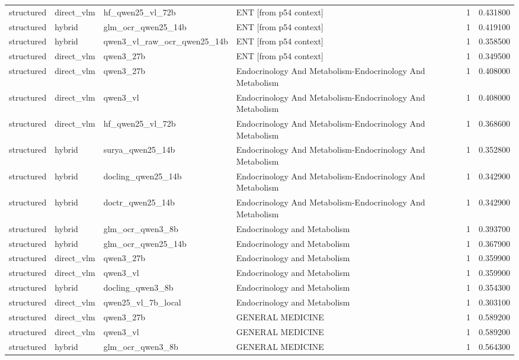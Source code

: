 \begin{tabular}{llllrr}
structured & direct\_vlm & hf\_qwen25\_vl\_72b & ENT [from p54 context] & 1 & 0.431800 \\
structured & hybrid & glm\_ocr\_qwen25\_14b & ENT [from p54 context] & 1 & 0.419100 \\
structured & hybrid & qwen3\_vl\_raw\_ocr\_qwen25\_14b & ENT [from p54 context] & 1 & 0.358500 \\
structured & direct\_vlm & qwen3\_27b & ENT [from p54 context] & 1 & 0.349500 \\
structured & direct\_vlm & qwen3\_27b & Endocrinology And Metabolism-Endocrinology And Metabolism & 1 & 0.408000 \\
structured & direct\_vlm & qwen3\_vl & Endocrinology And Metabolism-Endocrinology And Metabolism & 1 & 0.408000 \\
structured & direct\_vlm & hf\_qwen25\_vl\_72b & Endocrinology And Metabolism-Endocrinology And Metabolism & 1 & 0.368600 \\
structured & hybrid & surya\_qwen25\_14b & Endocrinology And Metabolism-Endocrinology And Metabolism & 1 & 0.352800 \\
structured & hybrid & docling\_qwen25\_14b & Endocrinology And Metabolism-Endocrinology And Metabolism & 1 & 0.342900 \\
structured & hybrid & doctr\_qwen25\_14b & Endocrinology And Metabolism-Endocrinology And Metabolism & 1 & 0.342900 \\
structured & hybrid & glm\_ocr\_qwen3\_8b & Endocrinology and Metabolism & 1 & 0.393700 \\
structured & hybrid & glm\_ocr\_qwen25\_14b & Endocrinology and Metabolism & 1 & 0.367900 \\
structured & direct\_vlm & qwen3\_27b & Endocrinology and Metabolism & 1 & 0.359900 \\
structured & direct\_vlm & qwen3\_vl & Endocrinology and Metabolism & 1 & 0.359900 \\
structured & hybrid & docling\_qwen3\_8b & Endocrinology and Metabolism & 1 & 0.354300 \\
structured & direct\_vlm & qwen25\_vl\_7b\_local & Endocrinology and Metabolism & 1 & 0.303100 \\
structured & direct\_vlm & qwen3\_27b & GENERAL MEDICINE & 1 & 0.589200 \\
structured & direct\_vlm & qwen3\_vl & GENERAL MEDICINE & 1 & 0.589200 \\
structured & hybrid & glm\_ocr\_qwen3\_8b & GENERAL MEDICINE & 1 & 0.564300 \\

\end{tabular}
